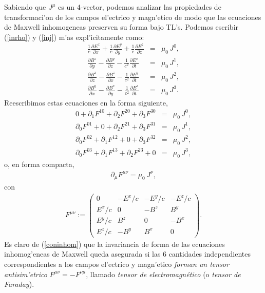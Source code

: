 Sabiendo que $J^\mu$ es un 4-vector, podemos analizar las propiedades de transformaci'on de los campos el'ectrico y magn'etico de modo que las ecuaciones de Maxwell inhomogeneas preserven su forma bajo TL's. Podemos escribir (\ref{inrho}) y (\ref{inj})  m'as expl'icitamente como:
\begin{eqnarray}
\frac{1}{c}\frac{\partial E^x}{\partial x} + \frac{1}{c}\frac{\partial E^y}{\partial y} + \frac{1}{c}\frac{\partial E^z}{\partial z} &=& \mu_0\, J^0 , \\
\frac{\partial B^z}{\partial y} - \frac{\partial B^y}{\partial z} - \frac{1}{c^2}\frac{\partial E^x}{\partial t} &=& \mu_0\,  J^1 , \\
\frac{\partial B^x}{\partial z} - \frac{\partial B^z}{\partial x} - \frac{1}{c^2}\frac{\partial E^y}{\partial t} &=& \mu_0\,  J^2 , \\
\frac{\partial B^y}{\partial x} - \frac{\partial B^x}{\partial y} - \frac{1}{c^2}\frac{\partial E^z}{\partial t} &=& \mu_0\,  J^3 .
\end{eqnarray}
Reescribimos estas ecuaciones en la forma siguiente,
\begin{eqnarray}
0 + \partial_1 F^{10} + \partial_2 F^{20} + \partial_3 F^{30} &=& \mu_0\,
J^0 ,\\
\partial_0 F^{01} + 0+ \partial_2 F^{21} + \partial_3 F^{31} &=& \mu_0\,
J^1 ,\\
\partial_0 F^{02} + \partial_1 F^{12} +0+ \partial_3 F^{32} &=& \mu_0\,
J^2 ,\\
\partial_0 F^{03} + \partial_1 F^{13} + \partial_2 F^{23} +0&=& \mu_0\,
J^3,
\end{eqnarray}
o, en forma compacta,
\begin{eqnarray}
\partial_\mu  F^{\mu \nu} = \mu_0\, J^\nu  , \label{coninhom}
\end{eqnarray}
con
\begin{eqnarray}
F^{\mu \nu}:=
\left(
\begin{array}{cccc}
0&-E^x/c&-E^y/c&-E^z/c\\
E^x/c&0&-B^z&B^y\\
E^y/c&B^z&0&-B^x\\
E^z/c&-B^y&B^x&0
\end{array}
\right) . \label{Fupup}
\end{eqnarray}
Es claro de (\ref{coninhom}) que la invariancia de forma de las ecuaciones inhomog'eneas de Maxwell queda asegurada si las 6 cantidades independientes correspondientes a los campos el'ectrico y magn'etico \textit{forman un tensor antisim'etrico} $F^{\mu \nu}=-F^{\nu\mu}$, llamado \textit{tensor de electromagn\'etico} (o \textit{tensor de Faraday}).

